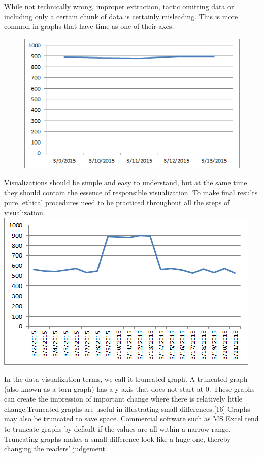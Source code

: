 \documentclass[]{book}
\theoremstyle{definition}
\theoremstyle{definition}
\theoremstyle{definition}
\theoremstyle{remark}
\begin{document}
While not technically wrong, improper extraction, tactic omitting data
or including only a certain chunk of data is certainly misleading. This
is more common in graphs that have time as one of their axes.

\begin{figure}
\centering
\includegraphics{images/Bad_graph_extraction.png}
\caption{}
\end{figure}

Visualizations should be simple and easy to understand, but at the same
time they should contain the essence of responsible visualization. To
make final results pure, ethical procedures need to be practiced
throughout all the steps of visualization.
\includegraphics{images/Good_graph_extraction.png}

In the data visualization terms, we call it truncated graph. A truncated
graph (also known as a torn graph) has a y-axis that does not start at
0. These graphs can create the impression of important change where
there is relatively little change.Truncated graphs are useful in
illustrating small differences.{[}16{]} Graphs may also be truncated to
save space. Commercial software such as MS Excel tend to truncate graphs
by default if the values are all within a narrow range. Truncating
graphs makes a small difference look like a huge one, thereby changing
the readers' judgement
\end{document}
